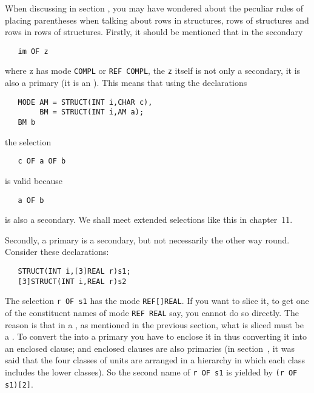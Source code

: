 \hypertarget{gram-paren}{}\label{gram-paren}%
When discussing  in section
, you may have wondered about the peculiar rules of
placing parentheses when talking about rows in structures, rows of
structures and rows in rows of structures.  Firstly, it should be
mentioned that in the secondary
\begin{verbatim}
   im OF z
\end{verbatim}
\noindent
where z has mode \verb|COMPL| or \verb|REF COMPL|, the \verb|z|
itself is not only a secondary, it is also a primary (it is an
). This means that using
the declarations
\begin{verbatim}
   MODE AM = STRUCT(INT i,CHAR c),
        BM = STRUCT(INT i,AM a);
   BM b
\end{verbatim}
\noindent
the selection
\begin{verbatim}
   c OF a OF b
\end{verbatim}
\noindent
is valid because
\begin{verbatim}
   a OF b
\end{verbatim}
\noindent
is also a secondary. We shall meet extended selections like this in
chapter~11.

Secondly, a primary is a secondary, but not necessarily the other way
round.  Consider these declarations:
\begin{verbatim}
   STRUCT(INT i,[3]REAL r)s1;
   [3]STRUCT(INT i,REAL r)s2
\end{verbatim}
\noindent
The selection \verb|r OF s1| has the mode \verb|REF[]REAL|.  If you
want to slice it, to get one of the constituent names of mode
\verb|REF REAL| say, you cannot do so directly.  The reason is that
in a , as mentioned in the previous section, what is sliced
must be a .  To convert the  into a primary
you have to enclose it in  thus converting it into an
enclosed clause; and enclosed clauses are also primaries (in
section~, it was said that the four classes of
units are arranged in a hierarchy in which each class includes the
lower classes).  So the second name of \verb|r OF s1| is yielded by
\verb|(r OF s1)[2]|.

